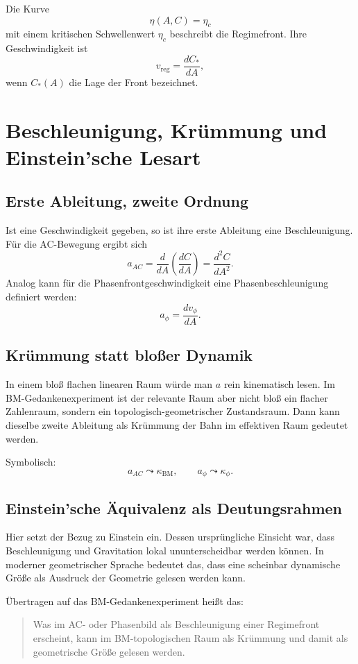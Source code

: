 \documentclass[11pt,a4paper]{article}
\theoremstyle{definition}
\theoremstyle{plain}
\begin{document}
	Die Kurve
	\[
	\eta(A,C)=\eta_c
	\]
	mit einem kritischen Schwellenwert $\eta_c$ beschreibt die Regimefront. Ihre Geschwindigkeit ist
	\[
	v_{\mathrm{reg}} = \frac{dC_*}{dA},
	\]
	wenn $C_*(A)$ die Lage der Front bezeichnet.
	
	\section{Beschleunigung, Krümmung und Einstein’sche Lesart}
	
	\subsection{Erste Ableitung, zweite Ordnung}
	
	Ist eine Geschwindigkeit gegeben, so ist ihre erste Ableitung eine Beschleunigung. Für die AC-Bewegung ergibt sich
	\[
	a_{AC} = \frac{d}{dA}\left(\frac{dC}{dA}\right) = \frac{d^2 C}{dA^2}.
	\]
	Analog kann für die Phasenfrontgeschwindigkeit eine Phasenbeschleunigung definiert werden:
	\[
	a_\phi = \frac{dv_\phi}{dA}.
	\]
	
	\subsection{Krümmung statt bloßer Dynamik}
	
	In einem bloß flachen linearen Raum würde man $a$ rein kinematisch lesen. Im BM-Gedankenexperiment ist der relevante Raum aber nicht bloß ein flacher Zahlenraum, sondern ein topologisch-geometrischer Zustandsraum. Dann kann dieselbe zweite Ableitung als Krümmung der Bahn im effektiven Raum gedeutet werden.
	
	Symbolisch:
	\[
	a_{AC}\leadsto \kappa_{\mathrm{BM}},
	\qquad
	a_\phi\leadsto \kappa_\phi.
	\]
	
	\subsection{Einstein’sche Äquivalenz als Deutungsrahmen}
	
	Hier setzt der Bezug zu Einstein ein. Dessen ursprüngliche Einsicht war, dass Beschleunigung und Gravitation lokal ununterscheidbar werden können. In moderner geometrischer Sprache bedeutet das, dass eine scheinbar dynamische Größe als Ausdruck der Geometrie gelesen werden kann.
	
	Übertragen auf das BM-Gedankenexperiment heißt das:
	\begin{quote}
		Was im AC- oder Phasenbild als Beschleunigung einer Regimefront erscheint, kann im BM-topologischen Raum als Krümmung und damit als geometrische Größe gelesen werden.
	\end{quote}
	
\end{document}
